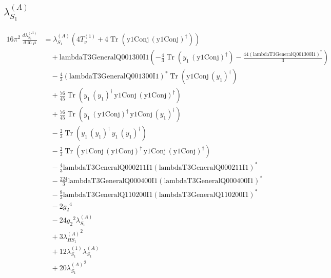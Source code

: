 \documentclass[10pt,a4paper]{article}
\begin{document}
\subsection*{$\lambda_{S_1}^{(A)}$}
\begin{align*}
16\pi^2\,\frac{d \lambda_{S_1}^{(A)}}{d\ln\mu} &={\lambda_{S_1}^{(A)}} (4 T_{\nu}^{(1)}+4 \operatorname{Tr}\!\left(\text{y1Conj}\,\left(\text{y1Conj}\right)^{\dagger}\right)) \\
&\quad +\text{lambdaT3GeneralQ001300I1} \left(-\frac{4}{3} \operatorname{Tr}\!\left({y_1}\,\left(\text{y1Conj}\right)^{\dagger}\right)-\frac{44 \left(\text{lambdaT3GeneralQ001300I1}\right)^{*}}{3}\right) \\
&\quad -\frac{4}{3} \left(\text{lambdaT3GeneralQ001300I1}\right)^{*} \operatorname{Tr}\!\left(\text{y1Conj}\,\left({y_1}\right)^{\dagger}\right) \\
&\quad +\frac{76}{45} \operatorname{Tr}\!\left({y_1}\,\left({y_1}\right)^{\dagger}\,\text{y1Conj}\,\left(\text{y1Conj}\right)^{\dagger}\right) \\
&\quad +\frac{76}{45} \operatorname{Tr}\!\left({y_1}\,\left(\text{y1Conj}\right)^{\dagger}\,\text{y1Conj}\,\left({y_1}\right)^{\dagger}\right) \\
&\quad -\frac{2}{3} \operatorname{Tr}\!\left({y_1}\,\left({y_1}\right)^{\dagger}\,{y_1}\,\left({y_1}\right)^{\dagger}\right) \\
&\quad -\frac{2}{3} \operatorname{Tr}\!\left(\text{y1Conj}\,\left(\text{y1Conj}\right)^{\dagger}\,\text{y1Conj}\,\left(\text{y1Conj}\right)^{\dagger}\right) \\
&\quad -\frac{4}{3} \text{lambdaT3GeneralQ000211I1} \left(\text{lambdaT3GeneralQ000211I1}\right)^{*} \\
&\quad -\frac{224}{3} \text{lambdaT3GeneralQ000400I1} \left(\text{lambdaT3GeneralQ000400I1}\right)^{*} \\
&\quad -\frac{8}{3} \text{lambdaT3GeneralQ110200I1} \left(\text{lambdaT3GeneralQ110200I1}\right)^{*} \\
&\quad -2 {g_2}^4 \\
&\quad -24 {g_2}^2 {\lambda_{S_1}^{(A)}} \\
&\quad +3 {\lambda_{HS_1}^{(A)}}^2 \\
&\quad +12 {\lambda_{S_1}^{(1)}} {\lambda_{S_1}^{(A)}} \\
&\quad +20 {\lambda_{S_1}^{(A)}}^2 \\
\end{align*}
\end{document}
